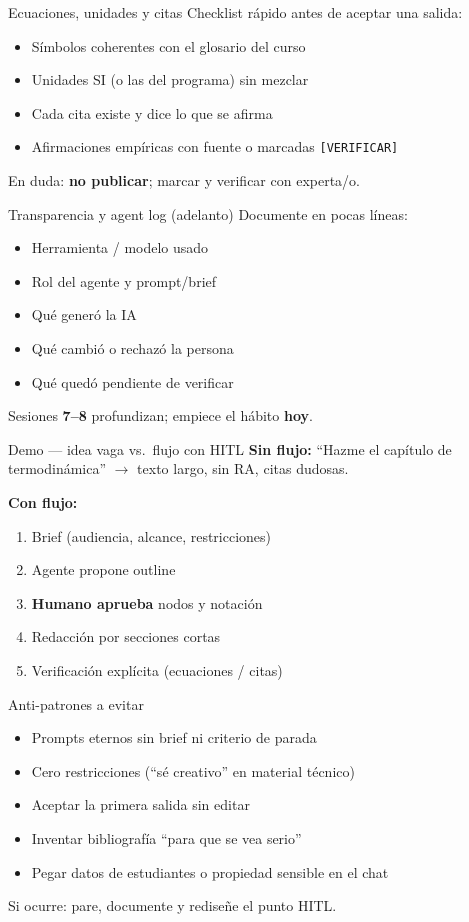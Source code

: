 \documentclass[aspectratio=169,11pt]{beamer}
\begin{document}
\begin{frame}{Ecuaciones, unidades y citas}
Checklist rápido antes de aceptar una salida:
\begin{itemize}
\item[$\square$] Símbolos coherentes con el glosario del curso
\item[$\square$] Unidades SI (o las del programa) sin mezclar
\item[$\square$] Cada cita existe y dice lo que se afirma
\item[$\square$] Afirmaciones empíricas con fuente o marcadas \texttt{[VERIFICAR]}
\end{itemize}
En duda: \textbf{no publicar}; marcar y verificar con experta/o.
\end{frame}

\begin{frame}{Transparencia y agent log (adelanto)}
Documente en pocas líneas:
\begin{itemize}
\item Herramienta / modelo usado
\item Rol del agente y prompt/brief
\item Qué generó la IA
\item Qué cambió o rechazó la persona
\item Qué quedó pendiente de verificar
\end{itemize}
Sesiones \textbf{7--8} profundizan; empiece el hábito \textbf{hoy}.
\end{frame}

\begin{frame}{Demo --- idea vaga vs.\ flujo con HITL}
\textbf{Sin flujo:} ``Hazme el capítulo de termodinámica'' $\rightarrow$ texto largo, sin RA, citas dudosas.

\textbf{Con flujo:}
\begin{enumerate}
\item Brief (audiencia, alcance, restricciones)
\item Agente propone outline
\item \textbf{Humano aprueba} nodos y notación
\item Redacción por secciones cortas
\item Verificación explícita (ecuaciones / citas)
\end{enumerate}
\end{frame}

\begin{frame}{Anti-patrones a evitar}
\begin{itemize}
\item Prompts eternos sin brief ni criterio de parada
\item Cero restricciones (``sé creativo'' en material técnico)
\item Aceptar la primera salida sin editar
\item Inventar bibliografía ``para que se vea serio''
\item Pegar datos de estudiantes o propiedad sensible en el chat
\end{itemize}
Si ocurre: pare, documente y rediseñe el punto HITL.
\end{frame}
\end{document}
